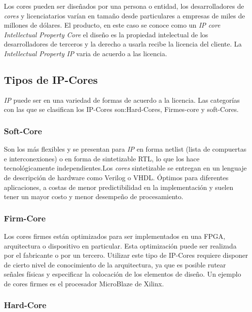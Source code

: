 Los cores pueden ser diseñados por una persona o entidad, los desarrolladores de \textit{cores} y licenciatarios varían en tamaño desde particulares a empresas de miles de millones de dólares. El producto, en este caso se conoce como un \textit{IP core  Intellectual Property Core} el diseño es la propiedad intelectual de los desarrolladores de terceros y la derecho a usarla recibe la licencia del cliente. La \textit{Intellectual Property IP} varia  de  acuerdo a las licencia.

		\subsection{Tipos de IP-Cores}

\textit{IP} puede ser en una variedad de formas de acuerdo a la licencia. Las categorías con las que se clasifican los IP-Cores son:Hard-Cores, Firmes-core y soft-Cores.
		
			\subsubsection{Soft-Core}

Son los más flexibles y se presentan para \textit{IP} en forma netlist (lista de compuertas e interconexiones) o en forma de sintetizable RTL, lo que los hace tecnológicamente independientes.Los \textit{cores} sintetizable se entregan en un lenguaje de descripción de hardware como Verilog o VHDL. 
 Óptimos para diferentes aplicaciones, a costas de menor predictibilidad en la implementación y suelen tener un mayor costo y menor desempeño de procesamiento.

		\subsubsection{Firm-Core}

Los cores firmes están optimizados para ser implementados en una FPGA, arquitectura o dispositivo en particular. Esta optimización puede ser realizada por el fabricante o por un tercero. Utilizar este tipo de IP-Cores requiere disponer de cierto nivel de conocimiento de la arquitectura, ya que es posible rutear señales físicas y especificar la colocación de los elementos de diseño. Un ejemplo de cores firmes es el procesador MicroBlaze de Xilinx.\cite{Etiqueta04}

		\subsubsection{Hard-Core}

